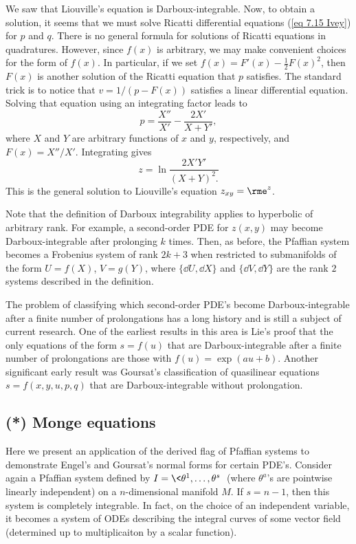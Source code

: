\begin{example}
    We saw that Liouville's equation is Darboux-integrable. Now, to obtain a solution, it seems that we must solve Ricatti differential equations (\ref{eq 7.15 Ivey}) for $p$ and $q$. There is no general formula for solutions of Ricatti equations in quadratures. However, since $f(x)$ is arbitrary, we may make convenient choices for the form of $f(x)$. In particular, if we set $f(x)=F'(x)-\frac12 F(x)^2$, then $F(x)$ is another solution of the Ricatti equation that $p$ satisfies. The standard trick is to notice that $v=1/(p-F(x))$ satisfies a linear differential equation. Solving that equation using an integrating factor leads to 
    \[p=\frac{X''}{X'}-\frac{2X'}{X+Y'},\]
    where $X$ and $Y$ are arbitrary functions of $x$ and $y$, respectively, and $F(x)=X''/X'$. Integrating gives 
    \[z=\ln \frac{2X'Y'}{(X+Y)^2.}\]
    This is the general solution to Liouville's equation $z_{xy}=\rme^z$.
\end{example}

Note that the definition of Darboux integrability applies to hyperbolic of arbitrary rank. For example, a second-order PDE for $z(x,y)$ may become Darboux-integrable after prolonging $k$ times. Then, as before, the Pfaffian system becomes a Frobenius system of rank $2k+3$ when restricted to submanifolds of the form $U=f(X)$, $V=g(Y)$, where $\{\dd U,\dd X\}$ and $\{\dd V,\dd Y\}$ are the rank $2$ systems described in the definition. 

The problem of classifying which second-order PDE's become Darboux-integrable after a finite number of prolongations has a long history and is still a subject of current research. One of the earliest results in this area is Lie's proof that the only equations of the form $s=f(u)$ that are Darboux-integrable after a finite number of prolongations are those with $f(u)=\exp(au+b)$. Another significant early result was Goursat's classification of quasilinear equations $s=f(x,y,u,p,q)$ that are Darboux-integrable without prolongation. 








\subsection{(*) Monge equations}

Here we present an application of the derived flag of Pfaffian systems to demonstrate Engel's and Goursat's normal forms for certain PDE's. Consider again a Pfaffian system defined by $I=\<\theta^1,\ldots,\theta^s\>$ (where $\theta^a$'s are pointwise linearly independent) on a $n$-dimensional manifold $M$. If $s=n-1$, then this system is completely integrable. In fact, on the choice of an independent variable, it becomes a system of ODEs describing the integral curves of some vector field (determined up to multiplicaiton by a scalar function).


